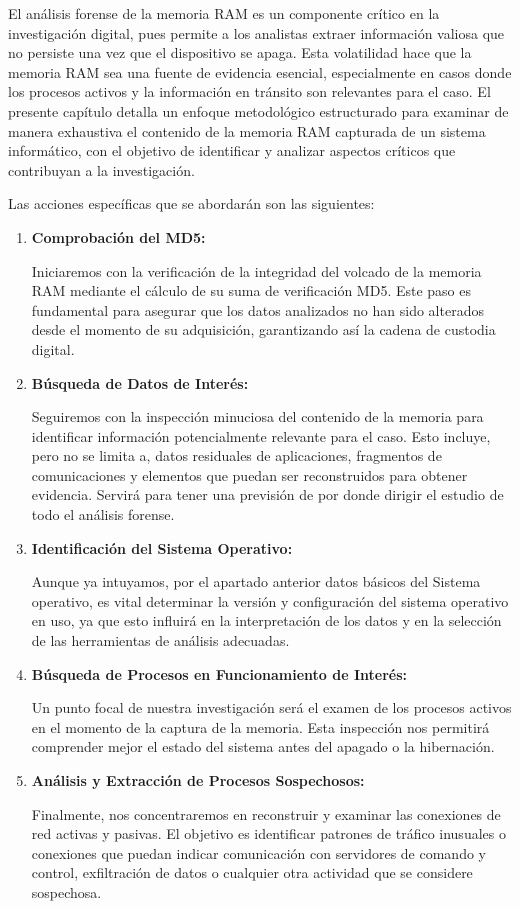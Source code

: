 El análisis forense de la memoria RAM es un componente crítico en la investigación digital, pues permite a los analistas extraer información valiosa que no persiste una vez que el dispositivo se apaga. Esta volatilidad hace que la memoria RAM sea una fuente de evidencia esencial, especialmente en casos donde los procesos activos y la información en tránsito son relevantes para el caso. El presente capítulo detalla un enfoque metodológico estructurado para examinar de manera exhaustiva el contenido de la memoria RAM capturada de un sistema informático, con el objetivo de identificar y analizar aspectos críticos que contribuyan a la investigación.

Las acciones específicas que se abordarán son las siguientes:

\begin{enumerate}
    \item  \textbf{Comprobación del MD5:}

    Iniciaremos con la verificación de la integridad del volcado de la memoria RAM mediante el cálculo de su suma de verificación MD5. Este paso es fundamental para asegurar que los datos analizados no han sido alterados desde el momento de su adquisición, garantizando así la cadena de custodia digital.

    \item \textbf{Búsqueda de Datos de Interés:}

    Seguiremos con la inspección minuciosa del contenido de la memoria para identificar información potencialmente relevante para el caso. Esto incluye, pero no se limita a, datos residuales de aplicaciones, fragmentos de comunicaciones y elementos que puedan ser reconstruidos para obtener evidencia. Servirá para tener una previsión de por donde dirigir el estudio de todo el análisis forense.

    \item \textbf{Identificación del Sistema Operativo:}

    Aunque ya intuyamos, por el apartado anterior datos básicos del Sistema operativo, es vital determinar la versión y configuración del sistema operativo en uso, ya que esto influirá en la interpretación de los datos y en la selección de las herramientas de análisis adecuadas.

    \item \textbf{Búsqueda de Procesos en Funcionamiento de Interés:}

    Un punto focal de nuestra investigación será el examen de los procesos activos en el momento de la captura de la memoria. Esta inspección nos permitirá comprender mejor el estado del sistema antes del apagado o la hibernación.

    \item \textbf{Análisis y Extracción de Procesos Sospechosos:}

    Finalmente, nos concentraremos en reconstruir y examinar las conexiones de red activas y pasivas. El objetivo es identificar patrones de tráfico inusuales o conexiones que puedan indicar comunicación con servidores de comando y control, exfiltración de datos o cualquier otra actividad que se considere sospechosa.

\end{enumerate}

